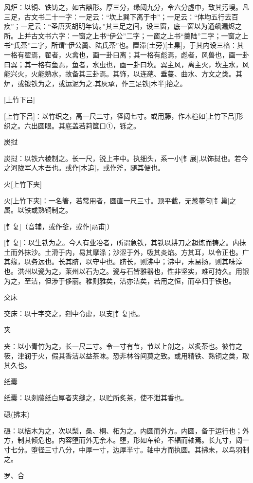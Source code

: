 \documentclass[12pt,UTF8]{ctexbook}
\begin{document}
风炉：以铜、铁铸之，如古鼎形。厚三分，缘阔九分，令六分虚中，致其污墁。凡三足，古文书二十一字：一足云：“坎上巽下离于中”；一足云：“体均五行去百疾”；一足云：“圣唐灭胡明年铸。”其三足之间，设三窗，底一窗以为通飙漏烬之所。上并古文书六字：一窗之上书“伊公”二字；一窗之上书“羹陆”二字；一窗之上书“氏茶”二字，所谓“伊公羹、陆氏茶”也。置滞(土旁)[土臬]，于其内设三格：其一格有翟焉，翟者，火禽也，画一卦曰离；其一格有彪焉，彪者，风兽也，画一卦曰巽；其一格有鱼焉，鱼者，水虫也，画一卦曰坎。巽主风，离主火，坎主水，风能兴火，火能熟水，故备其三卦焉。其饰，以连葩、垂蔓、曲水、方文之类。其炉，或锻铁为之，或运泥为之.其灰承，作三足铁[木半]抬之。

[上竹下吕]

[上竹下吕]：以竹织之，高一尺二寸，径阔七寸。或用藤，作木楦如[上竹下吕]形织之。六出圆眼。其底盖若莉箧口①，铄之。

炭挝

炭挝：以铁六棱制之。长一尺，锐上丰中。执细头，系一小[钅展],以饰挝也。若今之河陇军人木吾也。或作[木追]，或作斧，随其便也。

火[上竹下夹]

火[上竹下夹]：一名箸，若常用者，圆直一尺三寸。顶平截，无葱薹句[钅巢]之属。以铁或熟铜制之。

[钅复]（音辅，或作釜，或作[鬲甫]）

[钅复]：以生铁为之。今人有业冶者，所谓急铁，其铁以耕刀之趄炼而铸之。内抹土而外抹沙。土滑于内，易其摩涤；沙涩于外，吸其炎焰。方其耳，以令正也。广其缘，以务远也。长其脐，以守中也。脐长，则沸中；沸中，末易扬，则其味淳也。洪州以瓷为之，莱州以石为之。瓷与石皆雅器也，性非坚实，难可持久。用银为之，至洁，但涉于侈丽。稚则雅矣，洁亦洁矣，若用之恒，而卒归于铁也。

交床

交床：以十字交之，剜中令虚，以支[钅复]也。

夹

夹：以小青竹为之，长一尺二寸。令一寸有节，节以上剖之，以炙茶也。彼竹之筱，津润于火，假其香洁以益茶味。恐非林谷间莫之致。或用精铁、熟铜之类，取其久也。

纸囊

纸囊：以剡藤纸白厚者夹缝之，以贮所炙茶，使不泄其香也。

碾(拂末)

碾：以桔木为之，次以梨，桑、桐、柘为之。内圆而外方。内圆，备于运行也；外方，制其倾危也。内容堕而外无余木。堕，形如车轮，不辐而轴焉。长九寸，阔一寸七分。堕径三寸八分，中厚一寸，边厚半寸。轴中方而执圆。其拂未，以鸟羽制之。

罗、合
\end{document}
